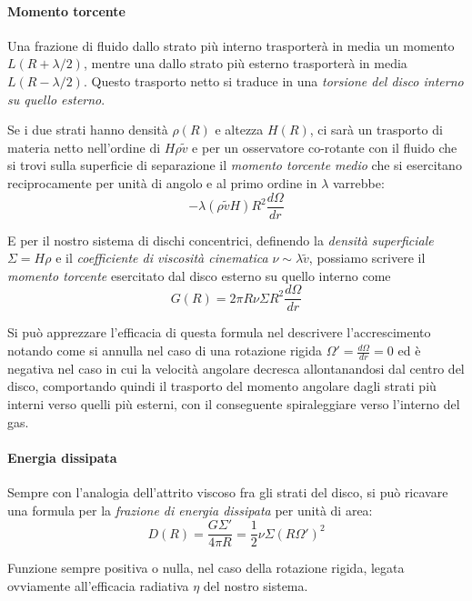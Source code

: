 \documentclass[a4paperbi]{article}
\begin{document}
	\paragraph{Momento torcente}
	Una frazione di fluido dallo strato più interno trasporterà in media un momento $L(R+\lambda/2)$, mentre una dallo strato più esterno trasporterà in media $L(R-\lambda/2)$. Questo trasporto netto si traduce in una \textit{torsione del disco interno su quello esterno}.
	
	Se i due strati hanno densità $\rho(R)$ e altezza $H(R)$, ci sarà un trasporto di materia netto nell'ordine di $H\rho\tilde{v}$ e per un osservatore co-rotante con il fluido che si trovi sulla superficie di separazione il \textit{momento torcente medio} che si esercitano reciprocamente per unità di angolo e al primo ordine in $\lambda$ varrebbe:
	\begin{equation*}
		-\lambda(\rho\tilde{v} H) R^2\frac{d\Omega}{dr}
	\end{equation*}
	
	E per il nostro sistema di dischi concentrici, definendo la \textit{densità superficiale} $\Sigma=H\rho$ e il \textit{coefficiente di viscosità cinematica} $\nu\sim\lambda\tilde{v}$, possiamo scrivere il \textit{momento torcente} esercitato dal disco esterno su quello interno come
	\begin{equation}
		G(R)=2\pi R\nu\Sigma R^2\frac{d\Omega}{dr}
	\end{equation}
	
	Si può apprezzare l'efficacia di questa formula nel descrivere l'accrescimento notando come si annulla nel caso di una rotazione rigida $\Omega'=\frac{d\Omega}{dr}=0$ ed è negativa nel caso in cui la velocità angolare decresca allontanandosi dal centro del disco, comportando quindi il trasporto del momento angolare dagli strati più interni verso quelli più esterni, con il conseguente spiraleggiare verso l'interno del gas.
		
	\paragraph{Energia dissipata}
	Sempre con l'analogia dell'attrito viscoso fra gli strati del disco, si può ricavare una formula per la \textit{frazione di energia dissipata} per unità di area:
	\begin{equation}
		D(R)=\frac{G\Sigma'}{4\pi R}=\frac{1}{2}\nu\Sigma(R\Omega')^2
	\end{equation}
	
	Funzione sempre positiva o nulla, nel caso della rotazione rigida, legata ovviamente all'efficacia radiativa $\eta$ del nostro sistema.
	
\end{document}
